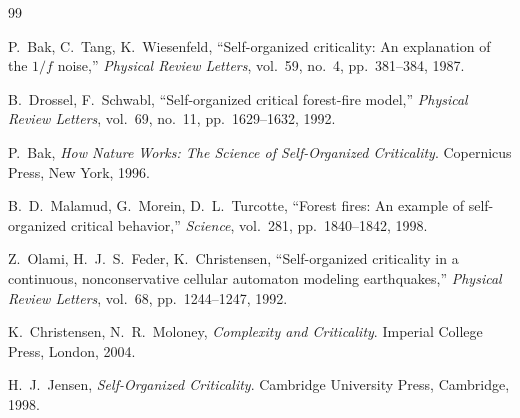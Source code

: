 \documentclass[12pt,a4paper]{article}
\begin{document}
\begin{thebibliography}{99}

P.\ Bak, C.\ Tang, K.\ Wiesenfeld,
``Self-organized criticality: An explanation of the $1/f$ noise,''
\textit{Physical Review Letters}, vol.~59, no.~4, pp.~381--384, 1987.

B.\ Drossel, F.\ Schwabl,
``Self-organized critical forest-fire model,''
\textit{Physical Review Letters}, vol.~69, no.~11, pp.~1629--1632, 1992.

P.\ Bak,
\textit{How Nature Works: The Science of Self-Organized Criticality}.
Copernicus Press, New York, 1996.

B.\ D.\ Malamud, G.\ Morein, D.\ L.\ Turcotte,
``Forest fires: An example of self-organized critical behavior,''
\textit{Science}, vol.~281, pp.~1840--1842, 1998.

Z.\ Olami, H.\ J.\ S.\ Feder, K.\ Christensen,
``Self-organized criticality in a continuous, nonconservative cellular
automaton modeling earthquakes,''
\textit{Physical Review Letters}, vol.~68, pp.~1244--1247, 1992.

K.\ Christensen, N.\ R.\ Moloney,
\textit{Complexity and Criticality}.
Imperial College Press, London, 2004.

H.\ J.\ Jensen,
\textit{Self-Organized Criticality}.
Cambridge University Press, Cambridge, 1998.

\end{thebibliography}
\end{document}
